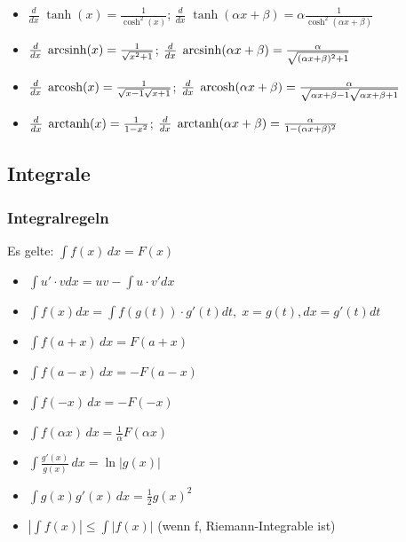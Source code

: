 \begin{itemize}[leftmargin=*]
	\item $\frac{d}{dx}\; \tanh(x) = \frac{1}{\cosh^2(x)}$;
	$\frac{d}{dx}\; \tanh(\alpha x + \beta) = \alpha
	\frac{1}{\cosh^2(\alpha x + \beta)}$
	\item $\frac{d}{dx}\; \operatorname{arcsinh}(x) = \frac{1}{\sqrt{x^2 + 1}}$;
	$\frac{d}{dx}\; \operatorname{arcsinh}(\alpha x + \beta) = \frac{\alpha}{\sqrt{(\alpha x
	+ \beta)^2 + 1}}$
	\item $\frac{d}{dx}\; \operatorname{arcosh}(x) = \frac{1}{\sqrt{x-1} \sqrt{x + 1}}$;
	$\frac{d}{dx}\; \operatorname{arcosh}(\alpha x + \beta) = \frac{\alpha}{\sqrt{\alpha x + \beta
	- 1} \sqrt{\alpha x + \beta + 1}}$
	\item $\frac{d}{dx}\; \operatorname{arctanh}(x) = \frac{1}{1-x^2}$;
	$\frac{d}{dx}\; \operatorname{arctanh}(\alpha x + \beta) = \frac{\alpha}{1 - (\alpha x +
	\beta)^2}$
\end{itemize}

\subsection{Integrale}
\subsubsection{Integralregeln}
Es gelte: $\int f(x) \, dx = F(x)$
\begin{itemize}[leftmargin=*]
	\item $\int u'\cdot v dx = uv - \int u \cdot v' dx$
	\item $\int f(x) dx = \int f(g(t)) \cdot g'(t) dt, \; x=g(t), dx = g'(t) dt$\newline\hfill
	\item $\int f(a + x) \,dx = F(a + x)$
	\item $\int f(a - x) \,dx = -F(a-x)$
	\item $\int f(-x) \,dx = -F(-x)$
	\item $\int f(\alpha x) \,dx = \frac{1}{\alpha}F(\alpha x)$
	\item $\int \frac{g'(x)}{g(x)} \, dx = \ln|g(x)|$
	\item $\int g(x)g'(x) \, dx = \frac{1}{2}g(x)^2$\\
	\item $|\int f(x)| \leq \int |f(x)|$ (wenn f, Riemann-Integrable ist)
\end{itemize}
